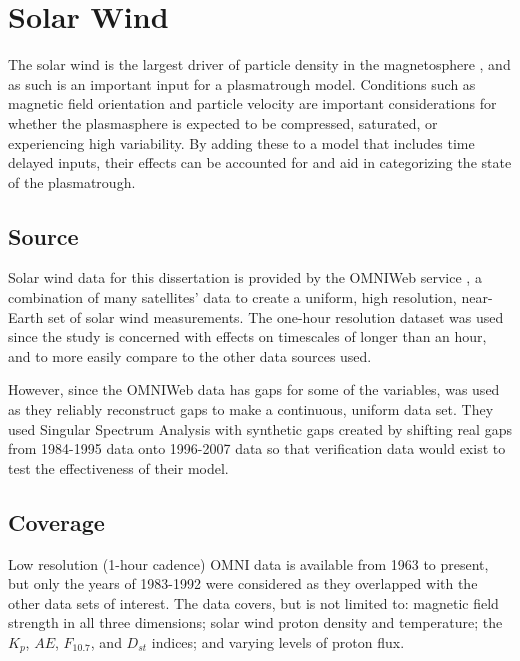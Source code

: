 
\section{Solar Wind}
The solar wind is the largest driver of particle density in the magnetosphere , and as such is an important input for a plasmatrough model. Conditions such as magnetic field orientation and particle velocity are important considerations for whether the plasmasphere is expected to be compressed, saturated, or experiencing high variability. By adding these to a model that includes time delayed inputs, their effects can be accounted for and aid in categorizing the state of the plasmatrough.

\subsection{Source}
Solar wind data for this dissertation is provided by the OMNIWeb service \citep{OMNIWebKing2005}, a combination of many satellites' data to create a uniform, high resolution, near-Earth set of solar wind measurements. The one-hour resolution dataset was used since the study is concerned with effects on timescales of longer than an hour, and to more easily compare to the other data sources used. 

However, since the OMNIWeb data has gaps for some of the variables, \cite{Kondrashov2014ReconstructionOfGaps} was used as they reliably reconstruct gaps to make a continuous, uniform data set. They used Singular Spectrum Analysis with synthetic gaps created by shifting real gaps from 1984-1995 data onto 1996-2007 data so that verification data would exist to test the effectiveness of their model. 

\subsection{Coverage}
Low resolution (1-hour cadence) OMNI data is available from 1963 to present, but only the years of 1983-1992 were considered as they overlapped with the other data sets of interest. The data covers, but is not limited to: magnetic field strength in all three dimensions; solar wind proton density and temperature; the $K_p$, $AE$, $F_{10.7}$, and $D_{st}$ indices; and varying levels of proton flux.

